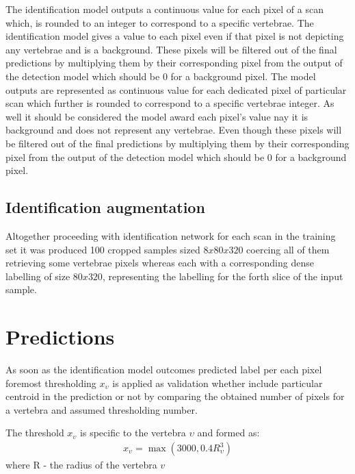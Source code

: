 The identification model outputs a continuous value for each pixel of a scan which, is rounded to an integer to correspond to a specific vertebrae. The identification model gives a value to each pixel even if that pixel is not depicting any vertebrae and is a background. These pixels will be filtered out of the final
predictions by multiplying them by their corresponding pixel from the output of the detection model which should be 0 for a background pixel. The model outputs are represented as continuous value for each dedicated pixel of particular scan which further is rounded to correspond to a specific vertebrae integer. As well it should be considered the model award each pixel's value nay it is background and does not represent any vertebrae. Even though these pixels will be filtered out of the final predictions by multiplying them by their corresponding pixel from the output of the detection model which should be 0 for a background pixel.

\subsection{Identification augmentation}
Altogether proceeding with identification network for each scan in the training set it was produced 100 cropped samples sized $8x80x320$ coercing all of them retrieving some vertebrae pixels whereas each with a corresponding dense labelling of size $80x320$, representing the labelling for the forth slice of the input sample.

\section{Predictions}
As soon as the identification model outcomes predicted label per each pixel foremost thresholding $x_\upsilon$ is applied as validation whether include particular centroid in the prediction or not by comparing the obtained  number of pixels for a vertebra and assumed thresholding number.

The threshold $x_\upsilon$ is specific to the vertebra $\upsilon$ and formed as:
\begin{align*}
  x_\upsilon = \max(3000, 0.4R_\upsilon^3) 
\end{align*}
where R - the radius of the vertebra $v$

